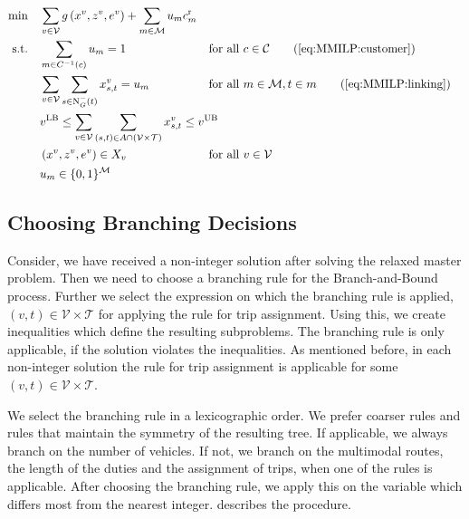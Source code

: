 \begin{align}
	\min \quad & \sum_{v\in\mathcal{V}}g\left(x^v,z^v,e^v\right) + \sum_{m\in\mathcal{M}} u_m \croute_m \nonumber \\
	\text{s.t.} \quad & \sum_{m\in C^{-1}(c)} u_m = 1 && \text{for all } c\in\mathcal{C} \tag{\ref{eq:MMILP:customer}} \\
	& \sum_{v\in\mathcal{V}}\sum_{s\in\Nin(t)}x^v_{s,t} = u_m && \text{for all } m\in\mathcal{M},t\in m \tag{\ref{eq:MMILP:linking}} \\
	& \omit\rlap{$\displaystyle{v^{\operatorname{LB}} \leq \sum_{\vinV}\sum_{(s,t)\in A\cap\left(\mathcal{V}\times\mathcal{T}\right)} x^v_{s,t} \leq v^{\operatorname{UB}}}$} \label{eq:MMILP:used_vehicles} \\
	& \left(x^v,z^v,e^v\right)\in X_v && \text{for all } v\in\mathcal{V} \nonumber \\
	& u_m\in\{0,1\}^{\mathcal{M}} \nonumber
\end{align}

\newpage


\subsection{Choosing Branching Decisions}

Consider, we have received a non-integer solution after solving the relaxed master problem. Then we need to choose a branching rule for the Branch-and-Bound process. Further we select the expression on which the branching rule is applied, \eg ${(v,t)\in\mathcal{V}\times\mathcal{T}}$ for applying the rule for trip assignment. Using this, we create inequalities which define the resulting subproblems. The branching rule is only applicable, if the solution violates the inequalities. As mentioned before, in each non-integer solution the rule for trip assignment is applicable for some ${(v,t) \in\mathcal{V}\times\mathcal{T}}$.

We select the branching rule in a lexicographic order. We prefer coarser rules and rules that maintain the symmetry of the resulting tree. If applicable, we always branch on the number of vehicles. If not, we branch on the multimodal routes, the length of the duties and the assignment of trips, when one of the rules is applicable. After choosing the branching rule, we apply this on the variable which differs most from the nearest integer.  describes the procedure.

